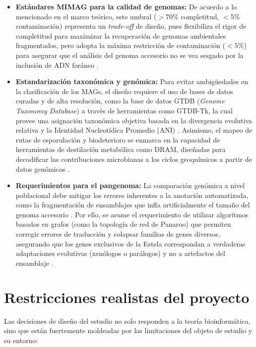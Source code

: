 \begin{itemize}
    \item \textbf{Estándares MIMAG para la calidad de genomas:} De acuerdo a lo mencionado en el marco teórico, este umbral ($>$70\% completitud, $<$5\% contaminación) representa un \textit{trade-off} de diseño, pues flexibiliza el rigor de completitud para maximizar la recuperación de genomas ambientales fragmentados, pero adopta la máxima restricción de contaminación ($<5\%$) para asegurar que el análisis del genoma accesorio no se vea sesgado por la inclusión de ADN foráneo \citep{bowers2017}.
    
    \item \textbf{Estandarización taxonómica y genómica:} Para evitar ambigüedades en la clasificación de los MAGs, el diseño requiere el uso de bases de datos curadas y de alta resolución, como la base de datos GTDB (\textit{Genome Taxonomy Database}) a través de herramientas como GTDB-Tk, la cual provee una asignación taxonómica objetiva basada en la divergencia evolutiva relativa y la Identidad Nucleotídica Promedio (ANI) \citep{gtdbtk2019}. Asimismo, el mapeo de rutas de esporulación y biodeterioro se enmarca en la capacidad de herramientas de destilación metabólica como DRAM, diseñadas para decodificar las contribuciones microbianas a los ciclos geoquímicos a partir de datos genómicos \citep{dram2020}.
    
    \item \textbf{Requerimientos para el pangenoma:} La comparación genómica a nivel poblacional debe mitigar los errores inherentes a la anotación automatizada, como la fragmentación de ensamblajes que infla artificialmente el tamaño del genoma accesorio \citep{panaroo2020}. Por ello, se asume el requerimiento de utilizar algoritmos basados en grafos (como la topología de red de Panaroo) que permiten corregir errores de traducción y colapsar familias de genes diversos, asegurando que los genes exclusivos de la Estela correspondan a verdaderas adaptaciones evolutivas (xenólogos o parálogos) y no a artefactos del ensamblaje \citep{panaroo2020}.
\end{itemize}

\section{Restricciones realistas del proyecto}
\label{sec:ref_restricciones}

Las decisiones de diseño del estudio no solo responden a la teoría bioinformática, sino que están fuertemente moldeadas por las limitaciones del objeto de estudio y su entorno:

